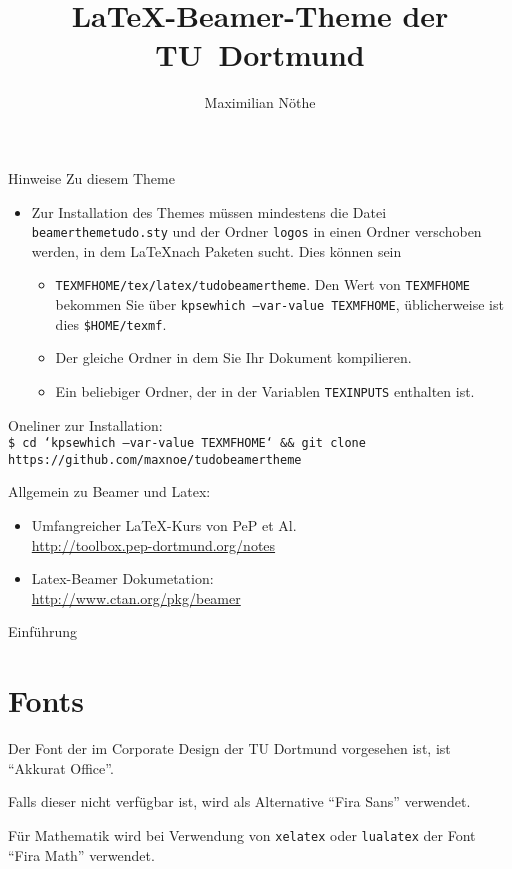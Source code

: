 \documentclass[aspectratio=1610, 9pt]{beamer}
\title{\LaTeX-Beamer-Theme der TU~Dortmund}
\author[M.~Nöthe]{Maximilian Nöthe}
\institute[Kurzform Lehrstuhl]{Names des Lehrstuhls \\  Name der Fakultät}
\begin{document}
\maketitle

\begin{frame}{Hinweise}
  Zu diesem Theme
  \begin{itemize}
    \item Zur Installation des Themes müssen mindestens die Datei \texttt{beamerthemetudo.sty} und der Ordner \texttt{logos} in einen Ordner verschoben werden, in dem \LaTeX nach Paketen sucht.
      Dies können sein
      \begin{itemize}
        \item \texttt{TEXMFHOME/tex/latex/tudobeamertheme}. Den Wert von \texttt{TEXMFHOME} bekommen Sie über \texttt{kpsewhich --var-value TEXMFHOME}, üblicherweise ist dies \texttt{\$HOME/texmf}.
        \item Der gleiche Ordner in dem Sie Ihr Dokument kompilieren.
        \item Ein beliebiger Ordner, der in der Variablen \texttt{TEXINPUTS} enthalten ist.
      \end{itemize}
  \end{itemize}

  Oneliner zur Installation:\\
  \texttt{\footnotesize\$ cd `kpsewhich --var-value TEXMFHOME` \&\& git clone https://github.com/maxnoe/tudobeamertheme}

  \medskip
  Allgemein zu Beamer und Latex:
  \begin{itemize}
    \item Umfangreicher \LaTeX-Kurs von PeP et Al. \\
      \url{http://toolbox.pep-dortmund.org/notes}
    \item Latex-Beamer Dokumetation:\\
    \url{http://www.ctan.org/pkg/beamer}
  \end{itemize}
\end{frame}

\begin{frame}{Einführung}
  \tableofcontents
\end{frame}

\section{Fonts}
\begin{frame}
  Der Font der im Corporate Design der TU Dortmund vorgesehen ist,
  ist \enquote{Akkurat Office}.

  Falls dieser nicht verfügbar ist, wird als Alternative \enquote{Fira Sans}
  verwendet.

  Für Mathematik wird bei Verwendung von \texttt{xelatex} oder \texttt{lualatex} der Font \enquote{Fira Math} verwendet.
\end{frame}
\end{document}

